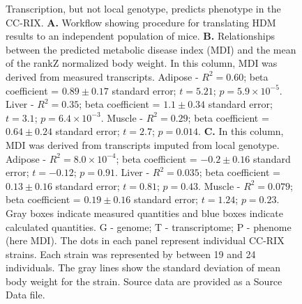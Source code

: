 \documentclass[
]{article}
\begin{document}
\begin{figure}[ht!]
\caption{Transcription, but not local genotype, predicts 
phenotype in the CC-RIX. \textbf{A.} Workflow showing 
procedure for translating HDM results to an independent 
population of mice. \textbf{B.} Relationships between the 
predicted metabolic disease index (MDI) and the mean
of the rankZ normalized body weight. In this column,
MDI was derived from measured transcripts. Adipose - 
$R^2 = 0.60$;  beta coefficient = $0.89\pm0.17$ 
standard error; $t = 5.21$; $p = 5.9\times10^{-5}$.
Liver - $R^2 = 0.35$;  beta coefficient = $1.1\pm0.34$ 
standard error; $t = 3.1$; $p = 6.4\times10^{-3}$.
Muscle - $R^2 = 0.29$;  beta coefficient = $0.64\pm0.24$ 
standard error; $t = 2.7$; $p = 0.014$.
\textbf{C.} In this column, MDI was derived from 
transcripts imputed from local genotype. Adipose - 
$R^2 = 8.0\times10^{-4}$;  beta coefficient = $-0.2\pm0.16$ 
standard error; $t = -0.12$; $p = 0.91$.
Liver - $R^2 = 0.035$;  beta coefficient = $0.13\pm0.16$ 
standard error; $t = 0.81$; $p = 0.43$.
Muscle - $R^2 = 0.079$;  beta coefficient = $0.19\pm0.16$ 
standard error; $t = 1.24$; $p = 0.23$.
Gray boxes indicate measured quantities and blue boxes 
indicate calculated quantities. G - genome; T - transcriptome; 
P - phenome (here MDI). The dots in each panel represent 
individual CC-RIX strains. Each strain was represented 
by between 19 and 24 individuals. The gray lines show 
the standard deviation of mean body weight for the 
strain. Source data are provided as a Source Data 
file.
}
\label{fig:cc_prediction}
\end{figure}
\end{document}
